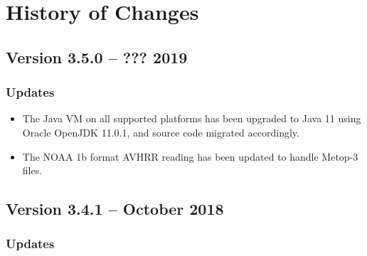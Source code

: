 \chapter{History of Changes}
\label{history}

\renewcommand{\thesection}{}
\renewcommand{\thesubsection}{\arabic{section}.\arabic{subsection}}
\makeatletter
\def\@seccntformat#1{\csname #1ignore\expandafter\endcsname\csname the#1\endcsname\quad}
\let\sectionignore\@gobbletwo
\let\latex@numberline\numberline
\def\numberline#1{\if\relax#1\relax\else\latex@numberline{#1}\fi}
\makeatother


\section{Version 3.5.0 -- ??? 2019}

\subsection*{ Updates}

\begin{itemize}

  \item The Java VM on all supported platforms has been upgraded to Java 11
  using Oracle OpenJDK 11.0.1, and source code migrated accordingly.

  \item The NOAA 1b format AVHRR reading has been updated to handle Metop-3
  files.





\end{itemize}


\section{Version 3.4.1 -- October 2018}

\subsection*{ Updates}

